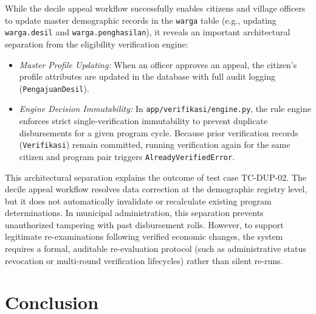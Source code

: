 \documentclass[runningheads]{llncs}
\begin{document}
While the decile appeal workflow successfully enables citizens and village officers to update master demographic records in the \texttt{warga} table (e.g., updating \texttt{warga.desil} and \texttt{warga.penghasilan}), it reveals an important architectural separation from the eligibility verification engine:
\begin{itemize}
    \item \textit{Master Profile Updating:} When an officer approves an appeal, the citizen's profile attributes are updated in the database with full audit logging (\nolinkurl{PengajuanDesil}).
    \item \textit{Engine Decision Immutability:} In \texttt{app/verifikasi/engine.py}, the rule engine enforces strict single-verification immutability to prevent duplicate disbursements for a given program cycle. Because prior verification records (\texttt{Verifikasi}) remain committed, running verification again for the same citizen and program pair triggers \texttt{AlreadyVerifiedError}.
\end{itemize}

This architectural separation explains the outcome of test case TC-DUP-02. The decile appeal workflow resolves data correction at the demographic registry level, but it does not automatically invalidate or recalculate existing program determinations. In municipal administration, this separation prevents unauthorized tampering with past disbursement rolls. However, to support legitimate re-examinations following verified economic changes, the system requires a formal, auditable re-evaluation protocol (such as administrative status revocation or multi-round verification lifecycles) rather than silent re-runs.

\section{Conclusion}
\end{document}
